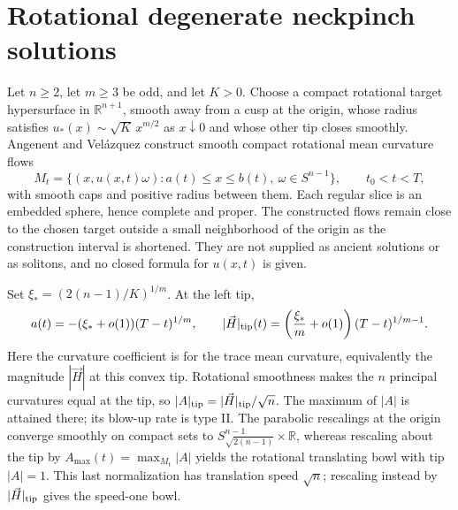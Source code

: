 \chapter{Rotational degenerate neckpinch solutions}\label{sec:catalogue-degenerate-neckpinches}
\begin{example}\label{ex:catalogue-degenerate-neckpinches}
Let $n\geq2$, let $m\geq3$ be odd, and let $K>0$. Choose a compact rotational target hypersurface in $\mathbb R^{n+1}$, smooth away from a cusp at the origin, whose radius satisfies $u_*(x)\sim\sqrt K\,x^{m/2}$ as $x\downarrow0$ and whose other tip closes smoothly. Angenent and Vel\'azquez construct smooth compact rotational mean curvature flows
\[
 M_t=\{(x,u(x,t)\omega):a(t)\leq x\leq b(t),\ \omega\in S^{n-1}\},
 \qquad t_0<t<T,
\]
with smooth caps and positive radius between them. Each regular slice is an embedded sphere, hence complete and proper. The constructed flows remain close to the chosen target outside a small neighborhood of the origin as the construction interval is shortened. They are not supplied as ancient solutions or as solitons, and no closed formula for $u(x,t)$ is given.

Set $\xi_*=(2(n-1)/K)^{1/m}$. At the left tip,
\[
 a(t)=-(\xi_*+o(1))(T-t)^{1/m},\qquad
 |\vec H|_{\rm tip}(t)=\left(\frac{\xi_*}{m}+o(1)\right)(T-t)^{1/m-1}.
\]
Here the curvature coefficient is for the trace mean curvature, equivalently the magnitude $|\vec H|$ at this convex tip. Rotational smoothness makes the $n$ principal curvatures equal at the tip, so $|A|_{\rm tip}=|\vec H|_{\rm tip}/\sqrt n$. The maximum of $|A|$ is attained there; its blow-up rate is type II. The parabolic rescalings at the origin converge smoothly on compact sets to $S^{n-1}_{\sqrt{2(n-1)}}\times\mathbb R$, whereas rescaling about the tip by $A_{\max}(t)=\max_{M_t}|A|$ yields the rotational translating bowl with tip $|A|=1$. This last normalization has translation speed $\sqrt n$; rescaling instead by $|\vec H|_{\rm tip}$ gives the speed-one bowl.


\end{example}
